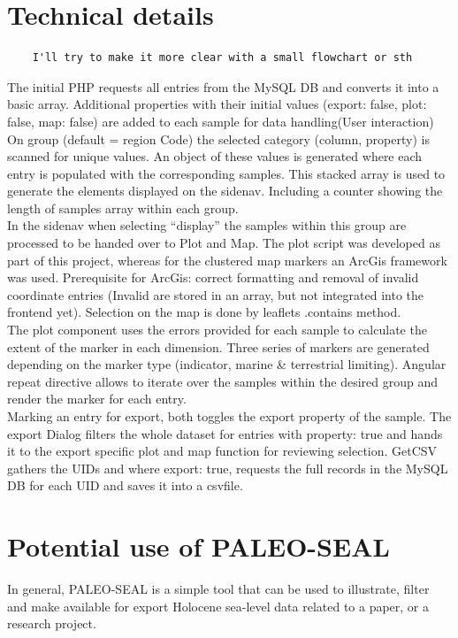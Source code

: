 \documentclass[a4paper,fleqn]{cas-dc}
\begin{document}
\section{Technical details}
\begin{verbatim}
	I'll try to make it more clear with a small flowchart or sth
\end{verbatim}
The initial PHP requests all entries from the MySQL DB and converts it into a basic array.  Additional properties with their initial values (export: false, plot: false, map: false) are added to each sample for data handling(User interaction)
On group (default = region Code) the selected category (column, property) is scanned for unique values. An object of these values is generated where each entry is populated with the corresponding samples. This stacked array is used to generate the elements displayed on the sidenav. Including a counter showing the length of samples array within each group. \\
In the sidenav when selecting “display” the samples within this group are processed to be handed over to Plot and Map. The plot script was developed as part of this project, whereas for the clustered map markers an ArcGis framework was used. Prerequisite for ArcGis: correct formatting and removal of invalid coordinate entries (Invalid are stored in an array, but not integrated into the frontend yet). Selection on the map is done by leaflets .contains method. \\ 
The plot component uses the errors provided for each sample to calculate the extent of the marker in each dimension. Three series of markers are generated depending on the marker type (indicator, marine \& terrestrial limiting). Angular repeat directive allows to iterate over the samples within the desired group and render the marker for each entry. \\
Marking an entry for export, both toggles the export property of the sample. The export Dialog filters the whole dataset for entries with property: true and hands it to the export specific plot and map function for reviewing selection. GetCSV gathers the UIDs and where export: true, requests the full records in the MySQL DB for each UID and saves it into a csvfile.


\section{Potential use of PALEO-SEAL}
In general, PALEO-SEAL is a simple tool that can be used to illustrate, filter and make available for export Holocene sea-level data related to a paper, or a research project.   

\printcredits

%



\end{document}
